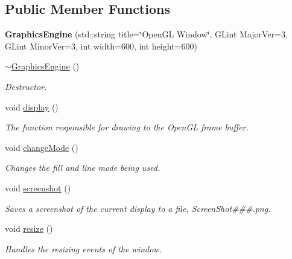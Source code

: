 \subsection*{Public Member Functions}
\begin{DoxyCompactItemize}
\item 
\mbox{\label{class_graphics_engine_a458fa2b36f864e0820a0a54ad58ff1c3}} 
{\bfseries Graphics\+Engine} (std\+::string title=\char`\"{}Open\+GL Window\char`\"{}, G\+Lint Major\+Ver=3, G\+Lint Minor\+Ver=3, int width=600, int height=600)
\item 
\hyperlink{class_graphics_engine_ab67afeefbc9f1c284f6ce310c31ae8f6}{$\sim$\+Graphics\+Engine} ()
\begin{DoxyCompactList}\small\item\em Destructor. \end{DoxyCompactList}\item 
void \hyperlink{class_graphics_engine_a2f0bdf1a47bf9e8d4f1c9525c2ebc8f9}{display} ()
\begin{DoxyCompactList}\small\item\em The function responsible for drawing to the Open\+GL frame buffer. \end{DoxyCompactList}\item 
\mbox{\label{class_graphics_engine_a7f549d3ad00c34e61d067fdd2a911034}} 
void \hyperlink{class_graphics_engine_a7f549d3ad00c34e61d067fdd2a911034}{change\+Mode} ()
\begin{DoxyCompactList}\small\item\em Changes the fill and line mode being used. \end{DoxyCompactList}\item 
\mbox{\label{class_graphics_engine_a7b12982b41cbdb107f48863798be2ed7}} 
void \hyperlink{class_graphics_engine_a7b12982b41cbdb107f48863798be2ed7}{screenshot} ()
\begin{DoxyCompactList}\small\item\em Saves a screenshot of the current display to a file, Screen\+Shot\#\#\#.png. \end{DoxyCompactList}\item 
void \hyperlink{class_graphics_engine_a6a38e40ee4227a8b53dddf07f92323ee}{resize} ()
\begin{DoxyCompactList}\small\item\em Handles the resizing events of the window. \end{DoxyCompactList}\item 

\end{DoxyCompactItemize}
